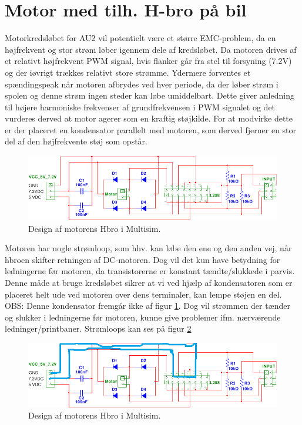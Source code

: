 \section{Motor med tilh. H-bro på bil}

Motorkredsløbet for AU2 vil potentielt være et større EMC-problem, da en højfrekvent og stor strøm løber igennem dele af kredsløbet.
Da motoren drives af et relativt højfrekvent PWM signal, hvis flanker går fra stel til forsyning (7.2V) og der iøvrigt trækkes relativt store strømme. 
Ydermere forventes et spændingspeak når motoren afbrydes ved hver periode, da der løber strøm i spolen og denne strøm ingen steder kan løbe umiddelbart.
Dette giver anledning til højere harmoniske frekvenser af grundfrekvensen i PWM signalet og det vurderes derved at motor agerer som en kraftig støjkilde.
For at modvirke dette er der placeret en kondensator parallelt med motoren, som derved fjerner en stor del af den højfrekvente støj som opstår.

\begin{figure}[h]
\centering
\includegraphics[width=\textwidth]{../fig/billeder/hbro_multisim.png}
\caption{Design af motorens Hbro i Multisim.}
\label{fig:hbro_multisim}
\end{figure}

Motoren har nogle strømloop, som hhv. kan løbe den ene og den anden vej, når hbroen skifter retningen af DC-motoren. 
Dog vil det kun have betydning for ledningerne før motoren, da transistorerne er konstant tændte/slukkede i parvis. %
Denne måde at bruge kredsløbet sikrer at vi ved hjælp af kondensatoren som er placeret helt ude ved motoren over dens terminaler, kan lempe støjen en del. OBS: Denne kondensator fremgår ikke af figur \ref{fig:hbro_multisim}. 
Dog vil strømmen der tænder og slukker i ledningerne før motoren, kunne give problemer ifm. nærværende ledninger/printbaner. 
Strømloops kan ses på figur \ref{fig:hbro_multisim_loops}

\begin{figure}[h]
\centering
\includegraphics[width=\textwidth]{../fig/billeder/hbro_multisim_loop.png}
\caption{Design af motorens Hbro i Multisim.}
\label{fig:hbro_multisim_loops}
\end{figure}

